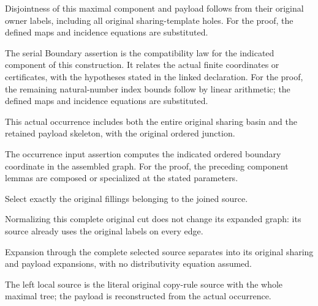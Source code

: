 Disjointness of this maximal component and payload follows from their original owner labels, including all original sharing-template holes.
For the proof, the defined maps and incidence equations are substituted.
\par{}

The serial Boundary assertion is the compatibility law for the indicated component of this construction. It relates the actual finite coordinates or certificates, with the hypotheses stated in the linked declaration.
For the proof, the remaining natural-number index bounds follow by linear arithmetic; the defined maps and incidence equations are substituted.
\par{}

This actual occurrence includes both the entire original sharing basin and the retained payload skeleton, with the original ordered junction.
\par{}

The occurrence input assertion computes the indicated ordered boundary coordinate in the assembled graph.
For the proof, the preceding component lemmas are composed or specialized at the stated parameters.
\par{}

Select exactly the original fillings belonging to the joined source.
\par{}

Normalizing this complete original cut does not change its expanded graph: its source already uses the original labels on every edge.
\par{}

Expansion through the complete selected source separates into its original sharing and payload expansions, with no distributivity equation assumed.
\par{}

The left local source is the literal original copy-rule source with the whole maximal tree; the payload is reconstructed from the actual occurrence.
\par{}

